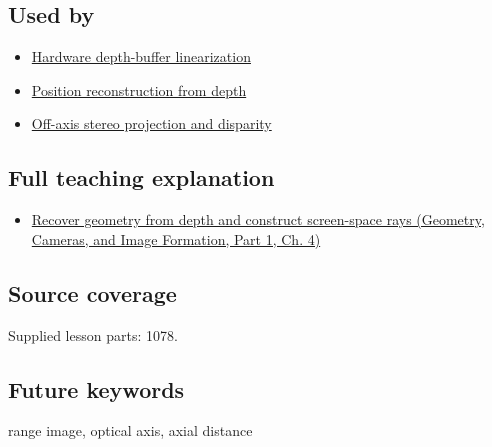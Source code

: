 \subsection{Used by}\label{appendix-cac01ebeeb11-used-by}

\hypertarget{appendix-cac01ebeeb11-used-by}{}

\begin{itemize}
\tightlist
\item
  \hyperref[appendix-1bc40b08db4a]{Hardware depth-buffer linearization}
\item
  \hyperref[appendix-2cbf2968e866]{Position reconstruction from depth}
\item
  \hyperref[appendix-0976e86e5b9f]{Off-axis stereo projection and disparity}
\end{itemize}

\subsection{Full teaching explanation}\label{appendix-cac01ebeeb11-full-teaching-explanation}

\hypertarget{appendix-cac01ebeeb11-full-teaching-explanation}{}

\begin{itemize}
\tightlist
\item
  \href{../03-Geometry-Cameras-and-Image-Formation-P01/main.pdf\#nameddest=02-foundations-ii-ch035-recover-geometry-from-depth-and-construct-screen-space-rays}{Recover geometry from depth and construct screen-space rays (Geometry, Cameras, and Image Formation, Part 1, Ch. 4)}
\end{itemize}

\subsection{Source coverage}\label{appendix-cac01ebeeb11-source-coverage}

\hypertarget{appendix-cac01ebeeb11-source-coverage}{}

Supplied lesson parts: 1078.

\subsection{Future keywords}\label{appendix-cac01ebeeb11-future-keywords}

\hypertarget{appendix-cac01ebeeb11-future-keywords}{}

range image, optical axis, axial distance
